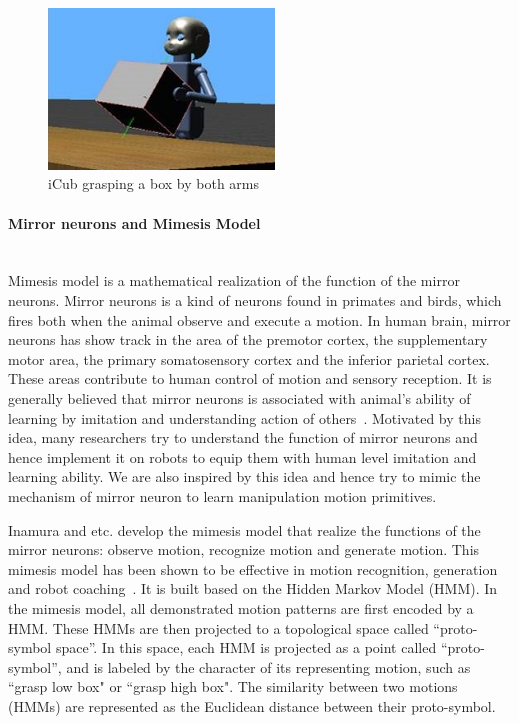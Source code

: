\begin{figure}
  \centering
  \includegraphics[width=6cm]{./fig_cha5/begin.jpg}
  \caption{ \scriptsize{iCub grasping a box by both arms}
}
    \label{begin}
    \vspace{-0.5cm}
\end{figure}



\paragraph{Mirror neurons and Mimesis Model} ~\\
Mimesis model is a mathematical realization of the function of the mirror neurons. Mirror neurons is a kind of neurons found in primates and birds, which fires both when the animal observe and execute a motion. In human brain, mirror neurons has show track in the area of the premotor cortex, the supplementary motor area, the primary somatosensory cortex and the inferior parietal cortex. These areas contribute to human control of motion and sensory reception. It is generally believed that mirror neurons is associated with animal's ability of learning by imitation and understanding action of others~\citep{rizzolatti2004mirror}. Motivated by this idea, many researchers try to understand the function of mirror neurons and hence implement it on robots to equip them with human level imitation and learning ability. We are also inspired by this idea and hence try to mimic the mechanism of mirror neuron to learn manipulation motion primitives.

Inamura and etc. develop the mimesis model that realize the functions of the mirror neurons: observe motion, recognize motion and generate motion.
This mimesis model has been shown to be effective in motion recognition, generation and robot coaching~\citep{inamura2008geometric,okuno2011motion}. It is built based on the Hidden Markov Model (HMM).
In the mimesis model, all demonstrated motion patterns are first encoded by a HMM. These HMMs are then projected to a topological space called ``proto-symbol space''. In this space, each HMM is projected as a point called ``proto-symbol'', and is labeled by the character of its representing motion, such as ``grasp low box" or ``grasp high box". The similarity between two motions (HMMs) are represented as the Euclidean distance between their proto-symbol.


